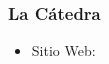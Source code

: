 \begin{frame}
  \frametitle{La Cátedra}
  \begin{itemize}
	  \item Sitio Web: 
  \end{itemize}
\end{frame}